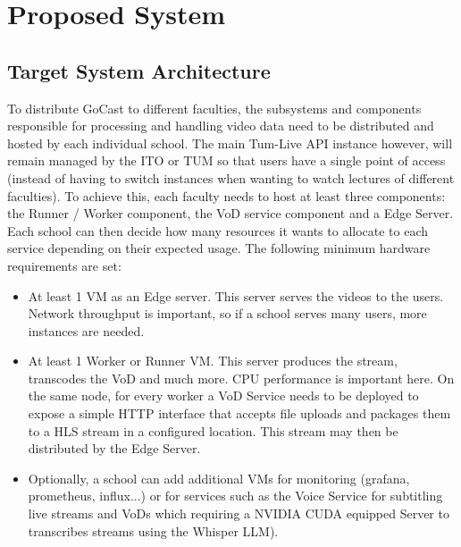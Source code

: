 \section{Proposed System}

\subsection{Target System Architecture}

To distribute GoCast to different faculties, the subsystems and components responsible for processing and handling video data need to be distributed and hosted by each individual school. 
The main Tum-Live API instance however, will remain managed by the \ac{ITO} or TUM so that users have a single point of access (instead of having to switch instances when wanting to watch lectures of different faculties).
To achieve this, each faculty needs to host at least three components: the Runner / Worker component, the VoD service component and a Edge Server. 
Each school can then decide how many resources it wants to allocate to each service depending on their expected usage. The following minimum hardware requirements are set:

\begin{itemize}
    \item At least 1 VM as an Edge server. This server serves the videos to the users. Network throughput is important, so if a school serves many users, more instances are needed.
    \item At least 1 Worker or Runner VM. This server produces the stream, transcodes the VoD and much more. CPU performance is important here. On the same node, for every worker a VoD Service needs to be deployed to expose a simple HTTP interface that accepts file uploads and packages them to a HLS stream in a configured location. This stream may then be distributed by the Edge Server.
    \item Optionally, a school can add additional VMs for monitoring (grafana, prometheus, influx...) or for services such as the Voice Service for subtitling live streams and VoDs which requiring a NVIDIA CUDA equipped Server to transcribes streams using the Whisper LLM).
\end{itemize}

